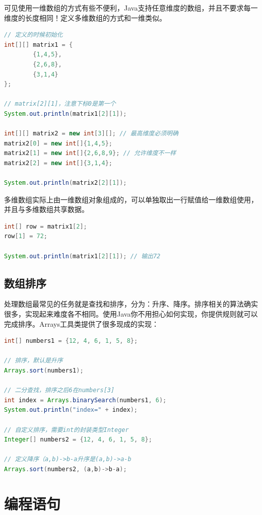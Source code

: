 可见使用一维数组的方式有些不便利，Java支持任意维度的数组，并且不要求每一维度的长度相同！定义多维数组的方式和一维类似。
\begin{lstlisting}[language=Java, caption={矩阵的二维数组表示},label=code:part1_array_2dim_matrix]
// 定义的时候初始化
int[][] matrix1 = {
        {1,4,5},
        {2,6,8},
        {3,1,4}
};

// matrix[2][1]，注意下标0是第一个
System.out.println(matrix1[2][1]);

int[][] matrix2 = new int[3][]; // 最高维度必须明确
matrix2[0] = new int[]{1,4,5};
matrix2[1] = new int[]{2,6,8,9}; // 允许维度不一样
matrix2[2] = new int[]{3,1,4};

System.out.println(matrix2[2][1]);
\end{lstlisting}

多维数组实际上由一维数组对象组成的，可以单独取出一行赋值给一维数组使用，并且与多维数组共享数据。
\begin{lstlisting}[language=Java]
int[] row = matrix1[2];
row[1] = 72;

System.out.println(matrix1[2][1]); // 输出72
\end{lstlisting}

\subsection{数组排序}
处理数组最常见的任务就是查找和排序，分为：升序、降序。排序相关的算法确实很多，实现起来难度各不相同。使用Java你不用担心如何实现，你提供规则就可以完成排序。Arrays工具类提供了很多现成的实现：
\begin{lstlisting}[language=Java]
int[] numbers1 = {12, 4, 6, 1, 5, 8};

// 排序，默认是升序
Arrays.sort(numbers1);

// 二分查找，排序之后6在numbers[3]
int index = Arrays.binarySearch(numbers1, 6);
System.out.println("index=" + index);

// 自定义排序，需要int的封装类型Integer
Integer[] numbers2 = {12, 4, 6, 1, 5, 8};

// 定义降序（a,b)->b-a升序是(a,b)->a-b
Arrays.sort(numbers2, (a,b)->b-a);
\end{lstlisting}


\section{编程语句}


